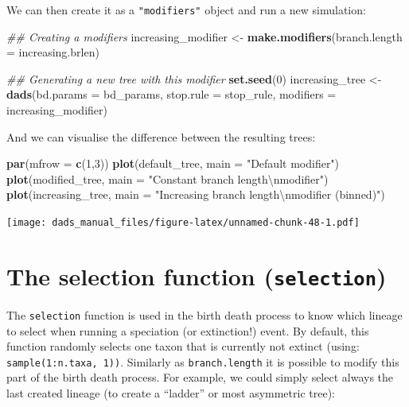 \documentclass[]{book}
\newenvironment{Shaded}{\begin{snugshade}}{\end{snugshade}}
\newcommand{\CharTok}[1]{\textcolor[rgb]{0.31,0.60,0.02}{#1}}
\newcommand{\CommentTok}[1]{\textcolor[rgb]{0.56,0.35,0.01}{\textit{#1}}}
\newcommand{\DataTypeTok}[1]{\textcolor[rgb]{0.13,0.29,0.53}{#1}}
\newcommand{\DecValTok}[1]{\textcolor[rgb]{0.00,0.00,0.81}{#1}}
\newcommand{\KeywordTok}[1]{\textcolor[rgb]{0.13,0.29,0.53}{\textbf{#1}}}
\newcommand{\NormalTok}[1]{#1}
\newcommand{\StringTok}[1]{\textcolor[rgb]{0.31,0.60,0.02}{#1}}
\begin{document}
We can then create it as a \texttt{"modifiers"} object and run a new simulation:

\begin{Shaded}
\begin{Highlighting}[]
\CommentTok{## Creating a modifiers}
\NormalTok{increasing_modifier <-}\StringTok{ }\KeywordTok{make.modifiers}\NormalTok{(}\DataTypeTok{branch.length =}\NormalTok{ increasing.brlen)}

\CommentTok{## Generating a new tree with this modifier}
\KeywordTok{set.seed}\NormalTok{(}\DecValTok{0}\NormalTok{)}
\NormalTok{increasing_tree <-}\StringTok{ }\KeywordTok{dads}\NormalTok{(}\DataTypeTok{bd.params =}\NormalTok{ bd_params,}
                        \DataTypeTok{stop.rule =}\NormalTok{ stop_rule,}
                        \DataTypeTok{modifiers =}\NormalTok{ increasing_modifier)}
\end{Highlighting}
\end{Shaded}

And we can visualise the difference between the resulting trees:

\begin{Shaded}
\begin{Highlighting}[]
\KeywordTok{par}\NormalTok{(}\DataTypeTok{mfrow =} \KeywordTok{c}\NormalTok{(}\DecValTok{1}\NormalTok{,}\DecValTok{3}\NormalTok{))}
\KeywordTok{plot}\NormalTok{(default_tree,    }\DataTypeTok{main =} \StringTok{"Default modifier"}\NormalTok{)}
\KeywordTok{plot}\NormalTok{(modified_tree,   }\DataTypeTok{main =} \StringTok{"Constant branch length}\CharTok{\textbackslash{}n}\StringTok{modifier"}\NormalTok{)}
\KeywordTok{plot}\NormalTok{(increasing_tree, }\DataTypeTok{main =} \StringTok{"Increasing branch length}\CharTok{\textbackslash{}n}\StringTok{modifier (binned)"}\NormalTok{)}
\end{Highlighting}
\end{Shaded}

\texttt{[image: dads\_manual\_files/figure-latex/unnamed-chunk-48-1.pdf]}

\hypertarget{the-selection-function-selection}{%
\section{\texorpdfstring{The selection function (\texttt{selection})}{The selection function (selection)}}\label{the-selection-function-selection}}

The \texttt{selection} function is used in the birth death process to know which lineage to select when running a speciation (or extinction!) event.
By default, this function randomly selects one taxon that is currently not extinct (using: \texttt{sample(1:n.taxa,\ 1))}.
Similarly as \texttt{branch.length} it is possible to modify this part of the birth death process.
For example, we could simply select always the last created lineage (to create a ``ladder'' or most asymmetric tree):
\end{document}
